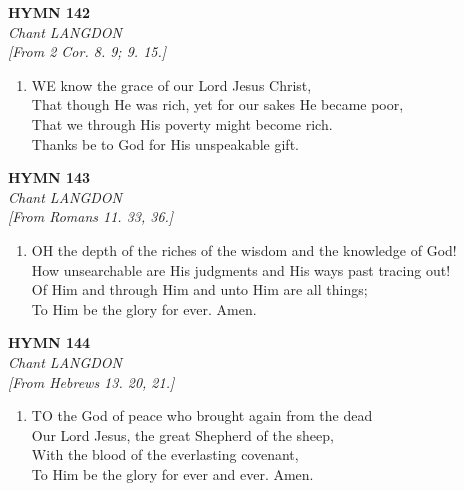 \newpage
\begin{center}
    {\Large \textbf{HYMN 142}}
    \\
    \textit{Chant LANGDON}
    \\
    \textit{\small [From 2 Cor. 8. 9; 9. 15.]}
\end{center}
\vspace{1em}

\begin{enumerate}
    \item WE know the grace of our Lord Jesus Christ, \\
        That though He was rich, yet for our sakes He became poor, \\
        That we through His poverty might become rich. \\
        Thanks be to God for His unspeakable gift.

\end{enumerate}

\newpage
\begin{center}
    {\Large \textbf{HYMN 143}}
    \\
    \textit{Chant LANGDON}
    \\
    \textit{\small [From Romans 11. 33, 36.]}
\end{center}
\vspace{1em}

\begin{enumerate}
    \item OH the depth of the riches of the wisdom and the knowledge of God! \\
        How unsearchable are His judgments and His ways past tracing out! \\
        Of Him and through Him and unto Him are all things; \\
        To Him be the glory for ever. Amen.

\end{enumerate}

\newpage
\begin{center}
    {\Large \textbf{HYMN 144}}
    \\
    \textit{Chant LANGDON}
    \\
    \textit{\small [From Hebrews 13. 20, 21.]}
\end{center}
\vspace{1em}

\begin{enumerate}
    \item TO the God of peace who brought again from the dead \\
        Our Lord Jesus, the great Shepherd of the sheep, \\
        With the blood of the everlasting covenant, \\
        To Him be the glory for ever and ever. Amen.

\end{enumerate}

